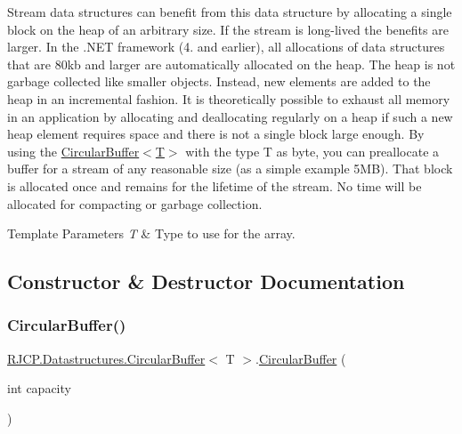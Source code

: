Stream data structures can benefit from this data structure by allocating a single block on the heap of an arbitrary size. If the stream is long-\/lived the benefits are larger. In the .N\+ET framework (4. and earlier), all allocations of data structures that are 80kb and larger are automatically allocated on the heap. The heap is not garbage collected like smaller objects. Instead, new elements are added to the heap in an incremental fashion. It is theoretically possible to exhaust all memory in an application by allocating and deallocating regularly on a heap if such a new heap element requires space and there is not a single block large enough. By using the \mbox{\hyperlink{class_r_j_c_p_1_1_datastructures_1_1_circular_buffer_af18decda3e642fce4e140de2375e67d4}{Circular\+Buffer$<$\+T$>$}} with the type {\ttfamily T} as {\ttfamily byte}, you can preallocate a buffer for a stream of any reasonable size (as a simple example 5MB). That block is allocated once and remains for the lifetime of the stream. No time will be allocated for compacting or garbage collection.


\begin{DoxyTemplParams}{Template Parameters}
{\em T} & Type to use for the array.\\
\hline
\end{DoxyTemplParams}


\subsection{Constructor \& Destructor Documentation}
\mbox{\label{class_r_j_c_p_1_1_datastructures_1_1_circular_buffer_af18decda3e642fce4e140de2375e67d4}} 
\subsubsection{\texorpdfstring{CircularBuffer()}{CircularBuffer()}\hspace{0.1cm}{\footnotesize\ttfamily [1/4]}}
{\footnotesize\ttfamily \mbox{\hyperlink{class_r_j_c_p_1_1_datastructures_1_1_circular_buffer}{R\+J\+C\+P.\+Datastructures.\+Circular\+Buffer}}$<$ T $>$.\mbox{\hyperlink{class_r_j_c_p_1_1_datastructures_1_1_circular_buffer}{Circular\+Buffer}} (\begin{DoxyParamCaption}\item[{int}]{capacity }\end{DoxyParamCaption})}



